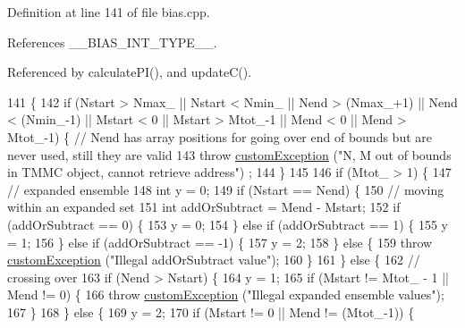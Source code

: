Definition at line 141 of file bias.\-cpp.



References \-\_\-\-\_\-\-B\-I\-A\-S\-\_\-\-I\-N\-T\-\_\-\-T\-Y\-P\-E\-\_\-\-\_\-.



Referenced by calculate\-P\-I(), and update\-C().


\begin{DoxyCode}
141                                                                                                            
                 \{
142     \textcolor{keywordflow}{if} (Nstart > Nmax\_ || Nstart < Nmin\_ || Nend > (Nmax\_+1) || Nend < (Nmin\_-1) || Mstart < 0 || Mstart > 
      Mtot\_-1 || Mend < 0 || Mend > Mtot\_-1) \{ \textcolor{comment}{// Nend has array positions for going over end of bounds but are
       never used, still they are valid}
143         \textcolor{keywordflow}{throw} \hyperlink{classcustom_exception}{customException} (\textcolor{stringliteral}{"N, M out of bounds in TMMC object, cannot retrieve address"})
      ;
144     \}
145 
146     \textcolor{keywordflow}{if} (Mtot\_ > 1) \{
147         \textcolor{comment}{// expanded ensemble}
148         \textcolor{keywordtype}{int} y = 0;
149         \textcolor{keywordflow}{if} (Nstart == Nend) \{
150             \textcolor{comment}{// moving within an expanded set}
151             \textcolor{keywordtype}{int} addOrSubtract = Mend - Mstart;
152             \textcolor{keywordflow}{if} (addOrSubtract == 0) \{
153                 y = 0;
154             \} \textcolor{keywordflow}{else} \textcolor{keywordflow}{if} (addOrSubtract == 1) \{
155                 y = 1;
156             \} \textcolor{keywordflow}{else} \textcolor{keywordflow}{if} (addOrSubtract == -1) \{
157                 y = 2;
158             \} \textcolor{keywordflow}{else} \{
159                 \textcolor{keywordflow}{throw} \hyperlink{classcustom_exception}{customException} (\textcolor{stringliteral}{"Illegal addOrSubtract value"});
160             \}
161         \} \textcolor{keywordflow}{else} \{
162             \textcolor{comment}{// crossing over}
163             \textcolor{keywordflow}{if} (Nend > Nstart) \{
164                 y = 1;
165                 \textcolor{keywordflow}{if} (Mstart != Mtot\_ - 1 || Mend != 0) \{
166                     \textcolor{keywordflow}{throw} \hyperlink{classcustom_exception}{customException} (\textcolor{stringliteral}{"Illegal expanded ensemble values"});
167                 \}
168             \} \textcolor{keywordflow}{else} \{
169                 y = 2;
170                 \textcolor{keywordflow}{if} (Mstart != 0 || Mend != (Mtot\_-1)) \{

\end{DoxyCode}
